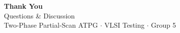 \begin{frame}
  \centering
  \vfill
  {\Large\textbf{Thank You}}\\[0.6em]
  {\footnotesize Questions \& Discussion}\\[1.4em]
  {\scriptsize Two-Phase Partial-Scan ATPG $\cdot$ VLSI Testing $\cdot$ Group 5}
  \vfill
\end{frame}
